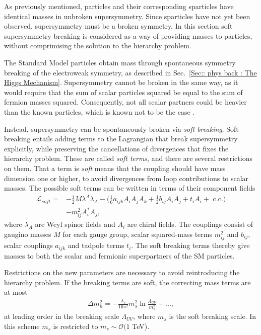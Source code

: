 \documentclass[twoside,english]{uiofysmaster}
\begin{document}
As previously mentioned, particles and their corresponding sparticles have identical masses in unbroken supersymmetry. Since sparticles have not yet been observed, supersymmetry must be a broken symmetry. In this section soft supersymmetry breaking is considered as a way of providing masses to particles, without comprimising the solution to the hierarchy problem.

The Standard Model particles obtain mass through spontaneous symmetry breaking of the electroweak symmetry, as described in Sec.~\ref{Sec:: phys back : The Higgs Mechanism}. Supersymmetry cannot be broken in the same way, as it would require that the sum of scalar particles squared be equal to the sum of fermion masses squared. Consequently, not all scalar partners could be heavier than the known particles, which is known not to be the case \cite{batzing2017lecture}. 

Instead, supersymmetry can be spontaneously broken via \textit{soft breaking}. Soft breaking entails adding terms to the Lagrangian that break supersymmetry explicitly, while preserving the cancellations of divergences that fixes the hierarchy problem. These are called \textit{soft terms}, and there are several restrictions on them. That a term is \textit{soft} means that the coupling should have mass dimension one or higher, to avoid divergences from loop contributions to scalar masses. The possible soft terms can be written in terms of their component fields
\begin{align}
\mathcal{L}_{soft} =& - \frac{1}{2} M \lambda^A \lambda_A - \Big(\frac{1}{6} a_{ijk} A_i A_j A_k + \frac{1}{2} b_{ij} A_i A_j + t_i A_i  + \text{ c.c.} \Big) \nonumber \\& - m_{ij}^2 A_i^*A_j,
\end{align}
where $\lambda_A$ are Weyl spinor fields and $A_i$ are chiral fields. The couplings consist of gaugino masses $M$ for each gauge group, scalar squared-mass terms $m_{ij}^2$ and $b_{ij}$, scalar couplings $a_{ijk}$ and tadpole terms $t_i$. The soft breaking terms thereby give masses to both the scalar and fermionic superpartners of the SM particles.

Restrictions on the new parameters are necessary to avoid reintroducing the hierarchy problem. If the breaking terms are soft, the correcting mass terms are at most
\begin{align*}
\Delta m_h^2 = - \frac{\lambda_s}{16 \pi^2} m_s^2\ln \frac{\Lambda_{UV}}{m_s^2} +...,
\end{align*}
at leading order in the breaking scale $\Lambda_{UV}$, where $m_s$ is the soft breaking scale. In this scheme $m_s$ is restricted to $m_s \sim \mathcal{O}(1$ TeV).
\end{document}
